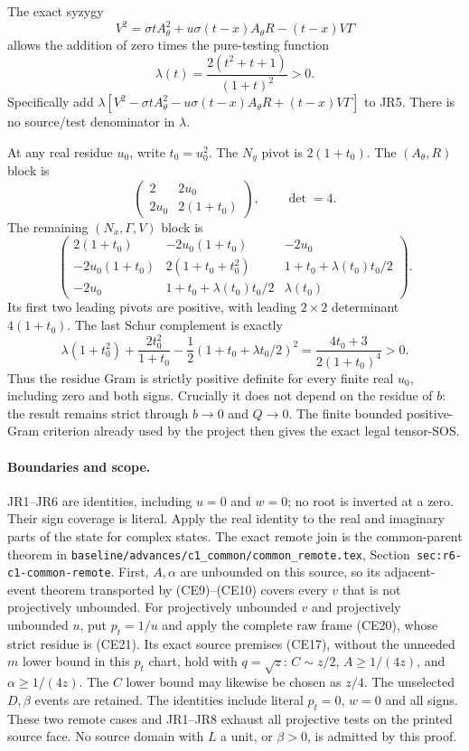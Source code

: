 The exact syzygy
\[
 V^2=\sigma t A_\theta^2+u\sigma(t-x)A_\theta R-(t-x)V\Gamma
\tag{JR6}
\]
allows the addition of zero times the pure-testing function
\[
 \lambda(t)=\frac{2(t^2+t+1)}{(1+t)^2}>0.
\]
Specifically add
$\lambda[V^2-\sigma tA_\theta^2-u\sigma(t-x)A_\theta R+(t-x)V\Gamma]$
to JR5. There is no source/test denominator in $\lambda$.

At any real residue $u_0$, write $t_0=u_0^2$. The $N_y$ pivot is
$2(1+t_0)$. The $(A_\theta,R)$ block is
\[
 \begin{pmatrix}2&2u_0\\2u_0&2(1+t_0)\end{pmatrix},
 \qquad \det=4.
\]
The remaining $(N_x,\Gamma,V)$ block is
\[
 \begin{pmatrix}
 2(1+t_0)&-2u_0(1+t_0)&-2u_0\\
 -2u_0(1+t_0)&2(1+t_0+t_0^2)&1+t_0+\lambda(t_0)t_0/2\\
 -2u_0&1+t_0+\lambda(t_0)t_0/2&\lambda(t_0)
 \end{pmatrix}.
\tag{JR7}
\]
Its first two leading pivots are positive, with leading $2\times2$
determinant $4(1+t_0)$. The last Schur complement is exactly
\[
 \lambda(1+t_0^2)+\frac{2t_0^2}{1+t_0}
       -\frac12(1+t_0+\lambda t_0/2)^2
   =\frac{4t_0+3}{2(1+t_0)^4}>0.
\tag{JR8}
\]
Thus the residue Gram is strictly positive definite for every finite
real $u_0$, including zero and both signs. Crucially it does not depend
on the residue of $b$: the result remains strict through $b\to0$
and $Q\to0$. The finite bounded positive-Gram criterion already used
by the project then gives the exact legal tensor-SOS.

\paragraph{Boundaries and scope.}
JR1--JR6 are identities, including $u=0$ and $w=0$; no root is inverted
at a zero. Their sign coverage is literal. Apply the real identity to
the real and imaginary parts of the state for complex states.
The exact remote join is the common-parent theorem in
\texttt{baseline/advances/c1\_common/common\_remote.tex},
Section~\texttt{sec:r6-c1-common-remote}. First, $A,\alpha$ are
unbounded on this source, so its adjacent-event theorem transported by
(CE9)--(CE10) covers every $v$ that is not projectively unbounded.
For projectively unbounded $v$ and projectively unbounded $u$, put
$p_t=1/u$ and apply the complete raw frame (CE20), whose strict
residue is (CE21). Its exact source premises (CE17), without the
unneeded $m$ lower bound in this $p_t$ chart, hold with $q=\sqrt z$:
$C\sim z/2$, $A\ge1/(4z)$, and $\alpha\ge1/(4z)$.
The $C$ lower bound may likewise be chosen as $z/4$. The unselected
$D,\beta$ events are retained. The identities include literal
$p_t=0$, $w=0$ and all signs. These two remote cases and JR1--JR8
exhaust all projective tests on the printed source face. No source
domain with $L$ a unit, or $\beta>0$, is admitted by this proof.

